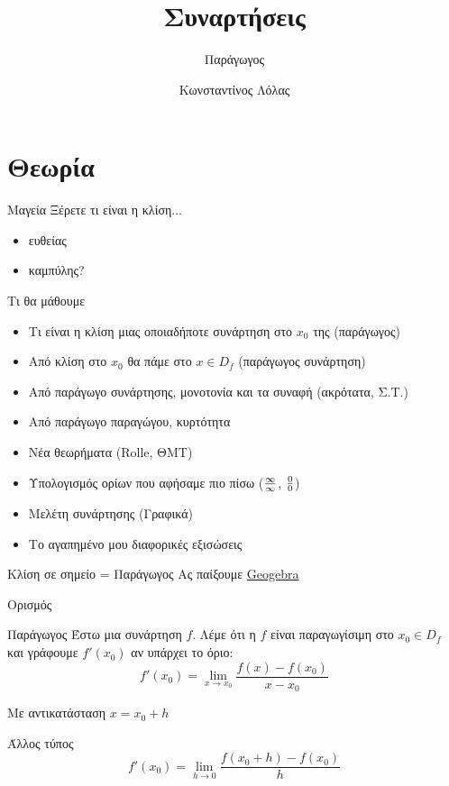 \documentclass[greek]{beamer}
\title{Συναρτήσεις}
\subtitle{Παράγωγος}
\author[Λόλας]{Κωνσταντίνος Λόλας}
\date{}
\begin{document}
\begin{frame}
  \titlepage
\end{frame}

\section{Θεωρία}
\begin{frame}{Μαγεία}
  Ξέρετε τι είναι η κλίση...
  \begin{itemize}
    \item<1-> ευθείας
    \item<2-> καμπύλης?
  \end{itemize}
\end{frame}

\begin{frame}{Τι θα μάθουμε}
  \begin{itemize}
    \item<1-> Τι είναι η κλίση μιας οποιαδήποτε συνάρτηση στο $x_0$ της (παράγωγος)
    \item<2-> Από κλίση στο $x_0$ θα πάμε στο $x\in D_f$ (παράγωγος συνάρτηση)
    \item<3-> Από παράγωγο συνάρτησης, μονοτονία και τα συναφή (ακρότατα, Σ.Τ.)
    \item<4-> Από παράγωγο παραγώγου, κυρτότητα
    \item<5-> Νέα θεωρήματα (Rolle, ΘΜΤ)
    \item<6-> Υπολογισμός ορίων που αφήσαμε πιο πίσω ($\infty \over \infty$, $0 \over 0$)
    \item<7-> Μελέτη συνάρτησης (Γραφικά)
    \item<8-> Το αγαπημένο μου  διαφορικές εξισώσεις
  \end{itemize}
\end{frame}

\begin{frame}{Κλίση σε σημείο = Παράγωγος}
  Ας παίξουμε
  \href{https://www.geogebra.org/m/v6g6qvfw}{Geogebra}
\end{frame}

\begin{frame}{Ορισμός}
  \begin{block}{Παράγωγος}
    Έστω μια συνάρτηση $f$. Λέμε ότι η $f$ είναι παραγωγίσιμη στο $x_0\in D_f$ και γράφουμε $f'(x_0)$ αν υπάρχει το όριο:
    $$f'(x_0)=\lim\limits_{x \to x_0}{ \frac{f(x)-f(x_0)}{x-x_0} }$$
  \end{block}

  Με αντικατάσταση $x=x_0+h$
  \begin{block}{Άλλος τύπος}
    $$f'(x_0)=\lim\limits_{h \to 0}{ \frac{f(x_0+h)-f(x_0)}{h} }$$
  \end{block}
\end{frame}
\end{document}
